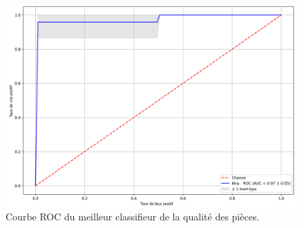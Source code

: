 \begin{figure}[hbtp]
	\centering
	\includegraphics[width=\textwidth,height=\textheight,keepaspectratio]{../Chap4/Figures/roc_images_all_224_3cams_densenet_conv4_PCA20.png}
	\caption{Courbe ROC du meilleur classifieur de la qualité des pièces.}
	\label{fig:roc}
\end{figure}


